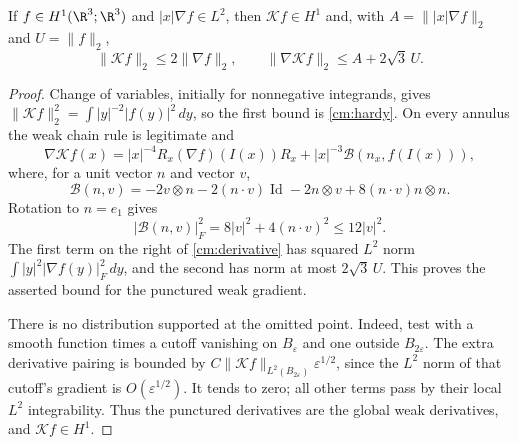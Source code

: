 \begin{lemma}\label{cm:inverted-h1}
If $f\in H^1(\R^3;\R^3)$ and $|x|\nabla f\in L^2$, then
$\mathcal Kf\in H^1$ and, with $A=\||x|\nabla f\|_2$ and $U=\|f\|_2$,
\begin{equation}\label{cm:inverted-bound}
 \|\mathcal Kf\|_2\le2\|\nabla f\|_2,
 \qquad \|\nabla\mathcal Kf\|_2\le A+2\sqrt3\,U.
\end{equation}
\end{lemma}
\begin{proof}
Change of variables, initially for nonnegative integrands, gives
$\|\mathcal Kf\|_2^2=\int |y|^{-2}|f(y)|^2\,dy$, so the first bound is
\eqref{cm:hardy}. On every annulus the weak chain rule is legitimate and
\begin{equation}\label{cm:derivative}
 \nabla\mathcal Kf(x)
 =|x|^{-4}R_x(\nabla f)(I(x))R_x
     +|x|^{-3}\mathcal B(n_x,f(I(x))),
\end{equation}
where, for a unit vector $n$ and vector $v$,
\[
 \mathcal B(n,v)=-2v\otimes n-2(n\cdot v)\operatorname{Id}
                -2n\otimes v+8(n\cdot v)n\otimes n.
\]
Rotation to $n=e_1$ gives
\[
 |\mathcal B(n,v)|_F^2=8|v|^2+4(n\cdot v)^2\le12|v|^2.
\]
The first term on the right of \eqref{cm:derivative} has squared $L^2$
norm $\int|y|^2|\nabla f(y)|_F^2\,dy$, and the second has norm at most
$2\sqrt3\,U$. This proves the asserted bound for the punctured weak
gradient.

There is no distribution supported at the omitted point. Indeed, test
with a smooth function times a cutoff vanishing on $B_\varepsilon$ and
one outside $B_{2\varepsilon}$. The extra derivative pairing is bounded
by $C\|\mathcal Kf\|_{L^2(B_{2\varepsilon})}\varepsilon^{1/2}$, since
the $L^2$ norm of that cutoff's gradient is $O(\varepsilon^{1/2})$.
It tends to zero; all other terms pass by their local $L^2$
integrability. Thus the punctured derivatives are the global weak
derivatives, and $\mathcal Kf\in H^1$.
\end{proof}

